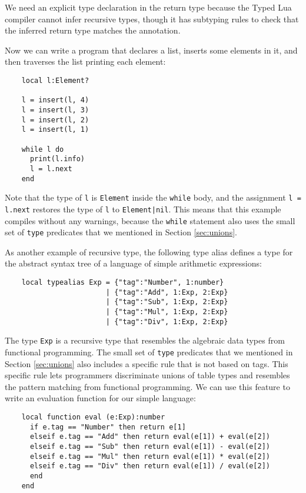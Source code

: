 We need an explicit type declaration in the return type because
the Typed Lua compiler cannot infer recursive types, though
it has subtyping rules to check that the inferred return type
matches the annotation.

Now we can write a program that declares a list, inserts some
elements in it, and then traverses the list printing
each element:
\begin{verbatim}
    local l:Element?

    l = insert(l, 4)
    l = insert(l, 3)
    l = insert(l, 2)
    l = insert(l, 1)

    while l do
      print(l.info)
      l = l.next
    end
\end{verbatim}

Note that the type of \texttt{l} is \texttt{Element} inside
the \texttt{while} body, and the assignment \texttt{l = l.next}
restores the type of \texttt{l} to \texttt{Element|nil}.
This means that this example compiles without any warnings, because the
\texttt{while} statement also uses the small set of \texttt{type}
predicates that we mentioned in Section \ref{sec:unions}.

As another example of recursive type, the following type alias
defines a type for the abstract syntax tree of a language of simple
arithmetic expressions:
\begin{verbatim}
    local typealias Exp = {"tag":"Number", 1:number}
                        | {"tag":"Add", 1:Exp, 2:Exp}
                        | {"tag":"Sub", 1:Exp, 2:Exp}
                        | {"tag":"Mul", 1:Exp, 2:Exp}
                        | {"tag":"Div", 1:Exp, 2:Exp}
\end{verbatim}

The type \texttt{Exp} is a recursive type that resembles the
algebraic data types from functional programming.
The small set of \texttt{type} predicates that we mentioned
in Section \ref{sec:unions} also includes a specific rule
that is not based on tags.
This specific rule lets programmers discriminate unions of table types
and resembles the pattern matching from functional programming.
We can use this feature to write an evaluation function for
our simple language:
\begin{verbatim}
    local function eval (e:Exp):number
      if e.tag == "Number" then return e[1]
      elseif e.tag == "Add" then return eval(e[1]) + eval(e[2])
      elseif e.tag == "Sub" then return eval(e[1]) - eval(e[2])
      elseif e.tag == "Mul" then return eval(e[1]) * eval(e[2])
      elseif e.tag == "Div" then return eval(e[1]) / eval(e[2])
      end
    end
\end{verbatim}

